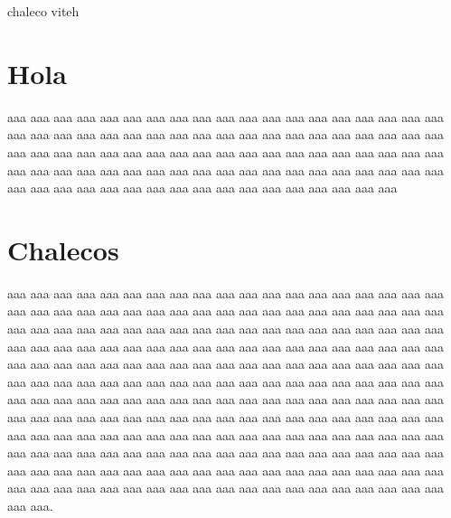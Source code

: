 
\renewcommand{\partes}{Sí}
\renewcommand{\titulodoc}{Título del Documento}
\newcommand{\ra}[1]{\renewcommand{\arraystretch}{#1}}





\tableofcontents



\clearpage

\thispagestyle{estandar}
\lipsum

\begin{parte-toc}
chaleco viteh
\end{parte-toc}	

\section*{Hola}

aaa aaa aaa aaa aaa aaa aaa aaa aaa aaa aaa aaa aaa aaa aaa aaa aaa aaa aaa aaa aaa aaa aaa aaa aaa aaa aaa aaa aaa aaa aaa aaa aaa aaa aaa aaa aaa aaa aaa aaa aaa aaa aaa aaa aaa aaa aaa aaa aaa aaa aaa aaa aaa aaa aaa aaa aaa aaa aaa aaa aaa aaa aaa aaa aaa aaa aaa aaa aaa aaa aaa aaa aaa aaa aaa aaa aaa aaa aaa aaa aaa aaa aaa aaa aaa aaa aaa aaa aaa aaa aaa aaa aaa 


\setcounter{chapter}{0}




\section{Chalecos}aaa aaa aaa aaa aaa aaa aaa aaa aaa aaa aaa aaa aaa aaa aaa aaa aaa aaa aaa aaa aaa aaa aaa aaa aaa aaa aaa aaa aaa aaa aaa aaa aaa aaa aaa aaa aaa aaa aaa aaa aaa aaa aaa aaa aaa aaa aaa aaa aaa aaa aaa aaa aaa aaa aaa aaa aaa aaa aaa aaa aaa aaa aaa aaa aaa aaa aaa aaa aaa aaa aaa aaa aaa aaa aaa aaa aaa aaa aaa aaa aaa aaa aaa aaa aaa aaa aaa aaa aaa aaa aaa aaa aaa aaa aaa aaa aaa aaa aaa aaa aaa aaa aaa aaa aaa aaa aaa aaa aaa aaa aaa aaa aaa aaa aaa aaa aaa aaa aaa aaa aaa aaa aaa aaa aaa aaa aaa aaa aaa aaa aaa aaa aaa aaa aaa aaa aaa aaa aaa aaa aaa aaa aaa aaa aaa aaa aaa aaa aaa aaa aaa aaa aaa aaa aaa aaa aaa aaa aaa aaa aaa aaa aaa aaa aaa aaa aaa aaa aaa aaa aaa aaa aaa aaa aaa aaa aaa aaa aaa aaa aaa aaa aaa aaa aaa aaa aaa aaa aaa aaa aaa aaa aaa aaa aaa aaa aaa aaa aaa aaa aaa aaa aaa aaa aaa aaa aaa aaa aaa aaa aaa aaa aaa aaa aaa aaa aaa aaa aaa aaa aaa aaa aaa aaa aaa aaa aaa aaa aaa aaa.

